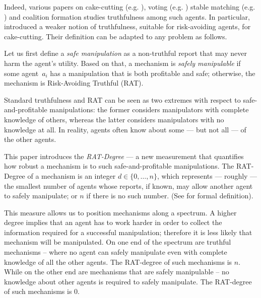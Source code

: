Indeed, various papers on cake-cutting
(e.g. \cite{brams2006better,BU2023Rat}),
voting (e.g. \cite{slinko2008nondictatorial,slinko2014ever,hazon2010complexity})
 stable matching (e.g. \citet{regret2018Fernandez, chen2024regret})
 and coalition formation \citep{waxman2021manipulation}
studies truthfulness among such agents.
%
In particular, \citet{BU2023Rat} introduced a weaker notion of truthfulness, suitable for risk-avoiding agents, for cake-cutting. 
Their definition can be adapted to any problem as follows.


Let us first define a \emph{safe manipulation} as a non-truthful report that 
may never harm the agent's utility. 
Based on that, a mechanism is \emph{safely manipulable} if some agent~$a_i$ has a manipulation that is both profitable and safe; otherwise, the mechanism is Risk-Avoiding Truthful (RAT).

Standard truthfulness and RAT can be seen as two extremes with respect to safe-and-profitable manipulations: the former considers manipulators with complete knowledge of
others, whereas the latter considers manipulators with no knowledge at all. 
In reality, agents often know about some — but not all — of the other agents.

This paper introduces the \emph{RAT-Degree} — a new measurement that quantifies how robust a mechanism is to such safe-and-profitable manipulations.
The RAT-Degree of a mechanism is an integer $d \in \{0, \ldots, n\}$, which represents --- roughly --- 
the smallest number of agents whose reports, if known, may allow another agent to safely manipulate; or $n$ if there is no such number.   (See  for formal definition).


This measure allows us to position mechanisms along a spectrum. A higher degree implies that an agent has to work harder in order to collect the information required for a successful manipulation; therefore it is less likely that mechanism will be manipulated.
%
%
On one end of the spectrum are truthful mechanisms -- where no agent can safely manipulate even with complete knowledge of all the other agents. The RAT-degree of such mechanisms is $n$.
While on the other end are mechanisms that are safely manipulable -- no knowledge about other agents is required to safely manipulate. The RAT-degree of such mechanisms is $0$.

